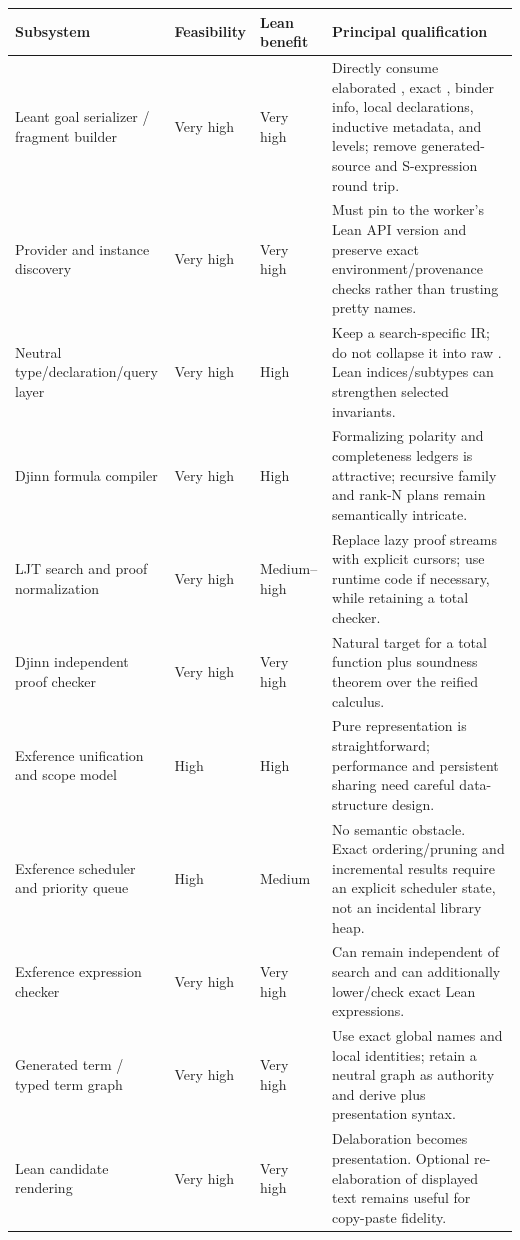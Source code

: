 \documentclass[10pt,letterpaper,oneside]{report}
\newcommand{\code}[1]{\texttt{\detokenize{#1}}}
\begin{document}
\begin{longtable}{@{}L{0.22\textwidth}C{0.11\textwidth}C{0.13\textwidth}L{0.46\textwidth}@{}}
\toprule
\textbf{Subsystem} & \textbf{Feasibility} & \textbf{Lean benefit} & \textbf{Principal qualification} \\
\midrule
\endhead
Leant goal serializer / fragment builder & Very high & Very high & Directly consume elaborated \code{Expr}, exact \code{Name}, binder info, local declarations, inductive metadata, and levels; remove generated-source and S-expression round trip. \\
Provider and instance discovery & Very high & Very high & Must pin to the worker's Lean API version and preserve exact environment/provenance checks rather than trusting pretty names. \\
Neutral type/declaration/query layer & Very high & High & Keep a search-specific IR; do not collapse it into raw \code{Expr}. Lean indices/subtypes can strengthen selected invariants. \\
Djinn formula compiler & Very high & High & Formalizing polarity and completeness ledgers is attractive; recursive family and rank-N plans remain semantically intricate. \\
LJT search and proof normalization & Very high & Medium--high & Replace lazy proof streams with explicit cursors; use \code{partial} runtime code if necessary, while retaining a total checker. \\
Djinn independent proof checker & Very high & Very high & Natural target for a total function plus soundness theorem over the reified calculus. \\
Exference unification and scope model & High & High & Pure representation is straightforward; performance and persistent sharing need careful data-structure design. \\
Exference scheduler and priority queue & High & Medium & No semantic obstacle. Exact ordering/pruning and incremental results require an explicit scheduler state, not an incidental library heap. \\
Exference expression checker & Very high & Very high & Can remain independent of search and can additionally lower/check exact Lean expressions. \\
Generated term / typed term graph & Very high & Very high & Use exact global names and local identities; retain a neutral graph as authority and derive \code{Expr} plus presentation syntax. \\
Lean candidate rendering & Very high & Very high & Delaboration becomes presentation. Optional re-elaboration of displayed text remains useful for copy-paste fidelity. \\

\end{longtable}
\end{document}
